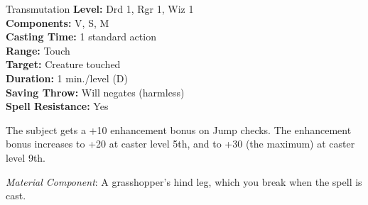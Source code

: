 {Transmutation}
{
	\textbf{Level:}
	Drd 1, Rgr 1, Wiz 1\\
	\textbf{Components:}
	V, S, M\\
	\textbf{Casting Time:}
	1 standard action\\
	\textbf{Range:}
	Touch\\
	\textbf{Target:}
	Creature touched\\
	\textbf{Duration:}
	1 min./level (D)\\
	\textbf{Saving Throw:}
	Will negates (harmless)\\
	\textbf{Spell Resistance:}
	Yes\\
}
{
	The subject gets a +10 enhancement bonus on Jump checks. The enhancement bonus increases to +20 at caster level 5th, and to +30 (the maximum) at caster level 9th.

	\textit{Material Component}:
	A grasshopper's hind leg, which you break when the spell is cast.

}
